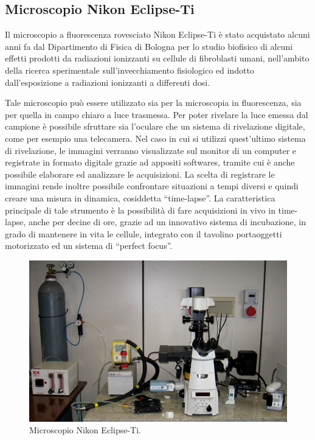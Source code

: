 \subsection{Microscopio Nikon Eclipse-Ti}

Il microscopio a fluorescenza rovesciato Nikon Eclipse-Ti è stato acquistato alcuni anni fa dal Dipartimento di Fisica di Bologna per lo studio biofisico di alcuni effetti prodotti da radiazioni ionizzanti su cellule di fibroblasti umani, nell'ambito della ricerca sperimentale sull'invecchiamento fisiologico ed indotto dall'esposizione a radiazioni ionizzanti a differenti dosi. 

Tale microscopio può essere utilizzato sia per la microscopia in fluorescenza, sia per quella in campo chiaro a luce trasmessa.
Per poter rivelare la luce emessa dal campione è possibile sfruttare sia l'oculare che un sistema di rivelazione digitale, come per esempio una telecamera.
Nel caso in cui si utilizzi quest'ultimo sistema di rivelazione, le immagini verranno visualizzate sul monitor di un computer e registrate in formato digitale grazie ad appositi softwares, tramite cui è anche possibile elaborare ed analizzare le acquisizioni. 
La scelta di registrare le immagini rende inoltre possibile confrontare situazioni a tempi diversi e quindi creare una misura in dinamica, cosiddetta ``time-lapse''. 
La caratteristica principale di tale strumento è la possibilità di fare acquisizioni in vivo in time-lapse, anche per decine di ore, grazie ad un innovativo sistema di incubazione, in grado di mantenere in vita le cellule, integrato con il tavolino portaoggetti motorizzato ed un sistema di ``perfect focus''.

\begin{figure}
 \centering
 \includegraphics[scale=.45]{img/CAP2microNIKON.png}
 \caption{\small{Microscopio Nikon Eclipse-Ti.}}
 \label{fig:NIKON}
\end{figure}

